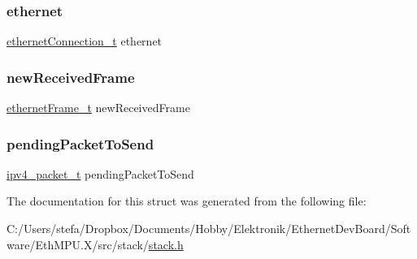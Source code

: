 \mbox{\label{structstack__t_ad531e518750e328d180181dad48b5a47}} 
\subsubsection{\texorpdfstring{ethernet}{ethernet}}
{\footnotesize\ttfamily \mbox{\hyperlink{group__ethernet_gae7b6008a02816680c2e3a1e3d2451a60}{ethernet\+Connection\+\_\+t}} ethernet}

\mbox{\label{structstack__t_adb9d89701c6708cac78a4c6373c307e6}} 
\subsubsection{\texorpdfstring{newReceivedFrame}{newReceivedFrame}}
{\footnotesize\ttfamily \mbox{\hyperlink{group__ethernet_ga7519a7ae14b490659069435698d28a25}{ethernet\+Frame\+\_\+t}} new\+Received\+Frame}

\mbox{\label{structstack__t_add38392b782a601d965c4f3cdca4617f}} 
\subsubsection{\texorpdfstring{pendingPacketToSend}{pendingPacketToSend}}
{\footnotesize\ttfamily \mbox{\hyperlink{group__ipv4_ga68ea36d252d9332fd5e37d9aaedd06af}{ipv4\+\_\+packet\+\_\+t}} pending\+Packet\+To\+Send}



The documentation for this struct was generated from the following file\+:\begin{DoxyCompactItemize}
\item 
C\+:/\+Users/stefa/\+Dropbox/\+Documents/\+Hobby/\+Elektronik/\+Ethernet\+Dev\+Board/\+Software/\+Eth\+M\+P\+U.\+X/src/stack/\mbox{\hyperlink{stack_8h}{stack.\+h}}\end{DoxyCompactItemize}
